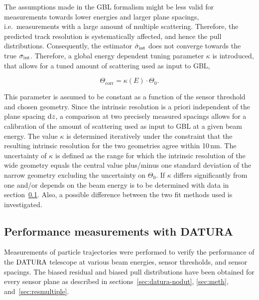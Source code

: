 The assumptions made in the GBL formalism might be less valid for measurements towards lower energies and larger plane spacings, i.e.\ measurements with a large amount of multiple scattering. 
Therefore, the predicted track resolution is systematically affected, and hence the pull distributions. 
Consequently, the estimator $\hat{\sigma}_{\textrm{int}}$ does not converge towards the true $\sigma_{\textrm{int}}$. 
Therefore, a global energy dependent tuning parameter $\kappa$ is introduced,
 that allows for a tuned amount of scattering used as input to GBL,

\begin{equation}
 \Theta_{\textrm{corr}} = \kappa(E) \cdot \Theta_0.
 \label{eq:thetacorr}
\end{equation}

\noindent
This parameter is assumed to be constant as a function of the sensor threshold and chosen geometry. 
Since the intrinsic resolution is a priori independent of the plane spacing $\textrm{d}z$,
 a comparison at two precisely measured spacings allows for a calibration of the amount of scattering used as input to GBL at a given beam energy. 
The value $\kappa$ is determined iteratively under the constraint that the resulting intrinsic resolution for the two geometries agree within 10\,nm.
The uncertainty of $\kappa$ is defined as the range for which the intrinsic resolution of the wide geometry equals the central value plus/minus one standard deviation of the narrow geometry
 excluding the uncertainty on $\Theta_0$. 
If $\kappa$ differs significantly from one and/or depends on the beam energy is to be determined with data in section~\ref{sec:measurements}. 
Also, a possible difference between the two fit methods used is investigated. 


\subsection{Performance measurements with DATURA}
\label{sec:measurements}

Measurements of particle trajectories were performed to verify the performance of the $\textrm{DATURA}$ telescope at various beam energies, sensor thresholds, and sensor spacings. %
The biased residual and biased pull distributions have been obtained for every sensor plane as described in sections~\ref{sec:datura-nodut}, \ref{sec:meth}, and~\ref{sec:resmultiple}. 
% 

